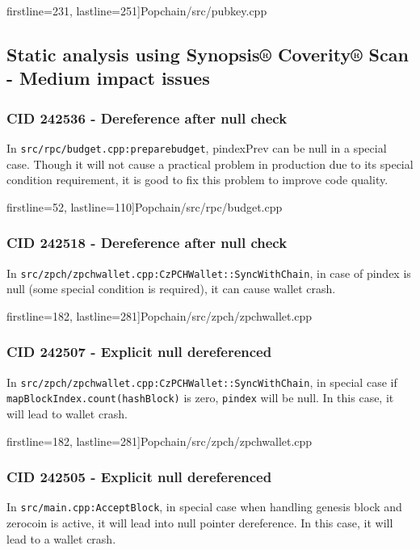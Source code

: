 \documentclass {article}
\begin{document}
 firstline=231, lastline=251]{Popchain/src/pubkey.cpp}

\subsection{Static analysis using Synopsis® Coverity® Scan - Medium impact issues}
\subsubsection{CID 242536 - Dereference after null check}
In \texttt{src/rpc/budget.cpp:preparebudget}, pindexPrev can be null in a special case.
Though it will not cause a practical problem in production due to its special
condition requirement, it is good to fix this problem to improve code quality.

 firstline=52, lastline=110]{Popchain/src/rpc/budget.cpp}

\subsubsection{CID 242518 - Dereference after null check}
In \texttt{src/zpch/zpchwallet.cpp:CzPCHWallet::SyncWithChain}, in case of
pindex is null (some special condition is required), it can cause wallet crash.

 firstline=182, lastline=281]{Popchain/src/zpch/zpchwallet.cpp}

\subsubsection{CID 242507 - Explicit null dereferenced}
In \texttt{src/zpch/zpchwallet.cpp:CzPCHWallet::SyncWithChain}, in special case
if \texttt{mapBlockIndex.count(hashBlock)} is zero, \texttt{pindex} will be
null. In this case, it will lead to wallet crash.

 firstline=182, lastline=281]{Popchain/src/zpch/zpchwallet.cpp}

\subsubsection{CID 242505 - Explicit null dereferenced}
In \texttt{src/main.cpp:AcceptBlock}, in special case when handling genesis
block and zerocoin is active, it will lead into null pointer dereference. In
this case, it will lead to a wallet crash.
\end{document}
